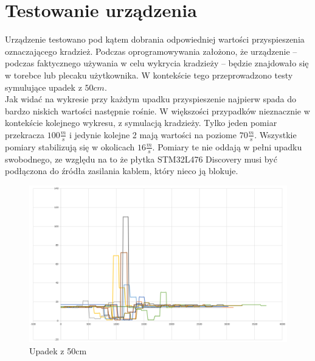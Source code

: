 \documentclass[10pt, a4paper]{article}
\begin{document}
\section{Testowanie urządzenia}
Urządzenie testowano pod kątem dobrania odpowiedniej wartości przyspieszenia oznaczającego kradzież. Podczas oprogramowywania założono, że urządzenie -- podczas faktycznego używania w celu wykrycia kradzieży -- będzie znajdowało się w torebce lub plecaku użytkownika. W kontekście tego przeprowadzono testy symulujące upadek z $50cm$. \\ 
Jak widać na wykresie przy każdym upadku przyspieszenie najpierw spada do bardzo niskich wartości następnie rośnie. W większości przypadków nieznacznie w kontekście kolejnego wykresu, z symulacją kradzieży. Tylko jeden pomiar przekracza $100 \frac{m}{s}$ i jedynie kolejne 2 mają wartości na poziome $70 \frac{m}{s}$. Wszystkie pomiary stabilizują się w okolicach $16 \frac{m}{s}$. Pomiary te nie oddają w pełni upadku swobodnego, ze względu na to że płytka STM32L476 Discovery musi być podłączona do źródła zasilania kablem, który nieco ją blokuje.

\begin{figure}[H]
\centering
\includegraphics[width=13cm]{figures/t1.png}
\caption{Upadek z 50cm}
\end{figure}
\end{document}
